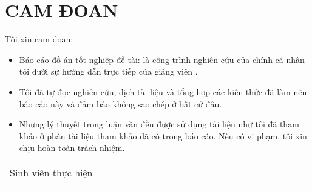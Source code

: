 \fontsize{13px}{13px}\selectfont\justifying

	\chapter*{CAM ĐOAN}
	\fontsize{13px}{13px}\selectfont\justifying
	
	Tôi xin cam đoan:
	\begin{itemize}
		\item Báo cáo đồ án tốt nghiệp đề tài: \emph{\project} là công trình nghiên cứu của chính cá nhân tôi dưới sự hướng dẫn trực tiếp của giảng viên \advisor.
		\item Tôi đã tự đọc nghiên cứu, dịch tài liệu và tổng hợp các kiến thức đã làm nên báo cáo này và đảm bảo không sao chép ở bất cứ đâu.
		\item Những lý thuyết trong luận văn đều được sử dụng tài liệu như tôi đã tham khảo ở phần tài liệu tham khảo đã có trong báo cáo. Nếu có vi phạm, tôi xin chịu hoàn toàn trách nhiệm.
	\end{itemize}
	
	\vspace{1cm}
	
	\hspace*{\fill}
	\begin{tabular}{c} %
		{\large Sinh viên thực hiện}
		\vspace{3cm}\\
		\me
	\end{tabular}
	
	
	


	
